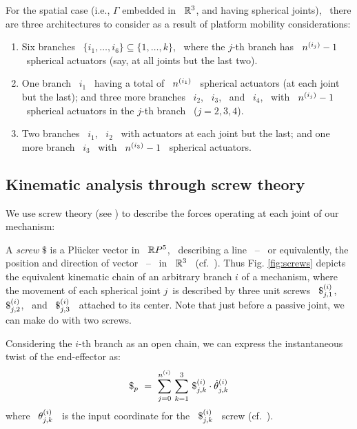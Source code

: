 For the spatial case (i.e., $\Gamma$ embedded in \ $\mathbb{R}^{3}$, and
having spherical joints), \ there are three architectures to
consider as a result of platform mobility considerations:
%
\begin{enumerate}
\renewcommand{\labelenumi}{(\alph{enumi})}
%
\item Six branches \
  $\{i_{1},\dotsc,i_{6}\}\subseteq\{1,\dotsc,k\}$, \ where the $j$-th
  branch has \ $n\sp{({i_{j}})}-1$ \ spherical actuators (say, at all
  joints but the last two).
%
\item One branch \ $i_{1}$ \ having a total of \ $n\sp{({i_{1}})}$ \
  spherical actuators (at each joint but the last); and three more
  branches \ $i_{2}$, \ $i_{3}$, \ and \ $i_{4}$, \ with \
  $n\sp{({i_{j}})}-1$ \ spherical actuators in the $j$-th branch \
  ($j=2,3,4$).
%
\item Two branches \ $i_{1}$, \ $i_{2}$ \ with actuators at each joint
    but the last; and one more branch \ $i_{3}$ \ with \
  $n\sp{({i_{3}})}-1$ \ spherical actuators.
%
\end{enumerate}

\subsection{Kinematic analysis through screw theory}
\label{ssth}

We use screw theory (see \cite{DH}) to describe the forces operating
at each joint of our mechanism:

A \emph{screw} $\$ $ is a Pl\"{u}cker vector in \ $\mathbb{R} P^{5}$, \
describing a line \ -- \ or equivalently, the position and
direction of vector \ -- \ in \  $\mathbb{R}^{3}$ \ (cf.\ \cite[\S
5]{M}). Thus  Fig. \ref{fig:screws} depicts the equivalent
kinematic chain of an arbitrary branch $i$ of a mechanism, where
the movement of each spherical joint $j$\ is described by three
unit screws \ $\$\sp{({i})}_{j,1}$, \ $\$\sp{({i})}_{j,2}$, \ and \
$\$\sp{({i})}_{j,3}$ \ attached to its center. Note that just before a
passive joint, we can make do with two screws.

Considering the $i$-th branch as an open chain, we can express the
instantaneous twist of the end-effector as:
%
\begin{equation}
\label{eq:vector_loop_equation}
%
 \$_{p}~=~\sum_{j=0}^{\nj{i}}\,\sum_{k=1}^{3}\,
\sj{i}_{j,k} \cdot \dot{\theta}\up{i}_{j,k}
%
\end{equation}
%
where \ $\theta\sp{({i})}_{j,k}$ \ is the input coordinate for the \
$\$\sp{({i})}_{j,k}$ \ screw (cf.\ \cite[\S 5.6]{T}). 

